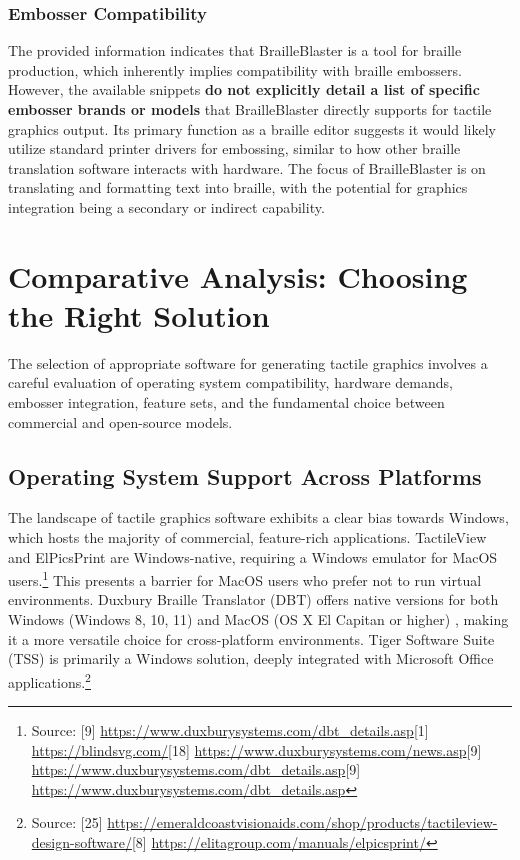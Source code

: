 \subsubsection{Embosser Compatibility}

The provided information indicates that BrailleBlaster is a tool for braille production, which inherently implies compatibility with braille embossers. However, the available snippets \textbf{do not explicitly detail a list of specific embosser brands or models} that BrailleBlaster directly supports for tactile graphics output. Its primary function as a braille editor suggests it would likely utilize standard printer drivers for embossing, similar to how other braille translation software interacts with hardware. The focus of BrailleBlaster is on translating and formatting text into braille, with the potential for graphics integration being a secondary or indirect capability.

\section{Comparative Analysis: Choosing the Right Solution}

The selection of appropriate software for generating tactile graphics involves a careful evaluation of operating system compatibility, hardware demands, embosser integration, feature sets, and the fundamental choice between commercial and open-source models.

\subsection{Operating System Support Across Platforms}

The landscape of tactile graphics software exhibits a clear bias towards Windows, which hosts the majority of commercial, feature-rich applications. TactileView and ElPicsPrint are Windows-native, requiring a Windows emulator for MacOS users.\footnote{Source: [9] \url{https://www.duxburysystems.com/dbt_details.asp}[1] \url{https://blindsvg.com/}[18] \url{https://www.duxburysystems.com/news.asp}[9] \url{https://www.duxburysystems.com/dbt_details.asp}[9] \url{https://www.duxburysystems.com/dbt_details.asp}} This presents a barrier for MacOS users who prefer not to run virtual environments. Duxbury Braille Translator (DBT) offers native versions for both Windows (Windows 8, 10, 11) and MacOS (OS X El Capitan or higher) \cite{[22, 21, 19]}, making it a more versatile choice for cross-platform environments. Tiger Software Suite (TSS) is primarily a Windows solution, deeply integrated with Microsoft Office applications.\footnote{Source: [25] \url{https://emeraldcoastvisionaids.com/shop/products/tactileview-design-software/}[8] \url{https://elitagroup.com/manuals/elpicsprint/}}

